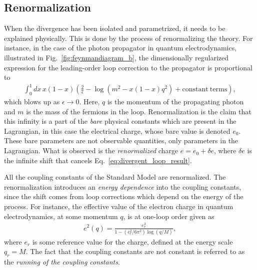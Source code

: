 \documentclass[twoside,english]{uiofysmaster}
\begin{document}
\subsection{Renormalization}
When the divergence has been isolated and parametrized, it needs to be explained physically. This is done by the process of renormalizing the theory. For instance, in the case of the photon propagator in quantum electrodynamics, illustrated in Fig.\ \ref{fig:feynmandiagram_b}, the dimensionally regularized expression for the leading-order loop correction to the propagator is proportional to
\begin{align}
	\int_0^1 dx \, x (1-x) \left( \frac{2}{\epsilon} - \log \left(m^2 - x(1-x)q^2 \right) + \mathrm{constant~terms} \right), \label{eq:divergent_loop_result}
\end{align}
which blows up as $\epsilon\to 0$. Here, $q$ is the momentum of the propagating photon and $m$ is the mass of the fermions in the loop. Renormalization is the claim that this infinity is a part of the {\it bare} physical constants which are present in the Lagrangian, in this case the electrical charge, whose bare value is denoted $e_0$. These bare parameters are not observable quantities, only parameters in the Lagrangian. What is observed is the {\it renormalized} charge $e = e_0 + \delta e$, where $\delta e$ is the infinite shift that cancels Eq.\ \eqref{eq:divergent_loop_result}.

All the coupling constants of the Standard Model are renormalized. The renormalization introduces an {\it energy dependence} into the coupling constants, since the shift comes from loop corrections which depend on the energy of the process. For instance, the effective value of the electron charge in quantum electrodynamics, at some momentum $q$, is at one-loop order given as
\begin{align}
	e^2(q) = \frac{e_r^2}{1 - (e_r^2/6\pi^2)\log(q/M)},\label{eq:electron_charge_running}
\end{align}
where $e_r$ is some reference value for the charge, defined at the energy scale $q_r = M$. The fact that the coupling constants are not constant is referred to as the {\it running of the coupling constants}.
\end{document}
